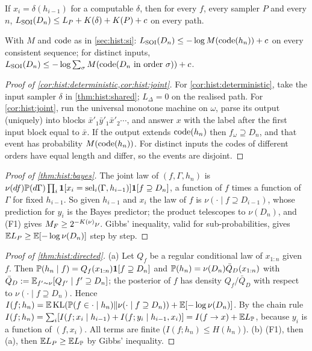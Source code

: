\begin{corollary}\label{cor:hist:deterministic}
If $x_i=\delta(h_{i-1})$ for a computable $\delta$, then for every $f$, every sampler $P$ and every $n$, $L_{\mathrm{SOI}}(D_n)\le L_P+K(\delta)+K(P)+c$ on every path.
\end{corollary}

\begin{corollary}\label{cor:hist:joint}
With $M$ and $\operatorname{code}$ as in \cref{sec:hist:si}: $L_{\mathrm{SOI}}(D_n)\le-\log M(\operatorname{code}(h_n))+c$ on every consistent sequence; for distinct inputs, $L_{\mathrm{SOI}}(D_n)\le-\log\sum_\sigma M(\operatorname{code}(D_n\text{ in order }\sigma))+c$.
\end{corollary}

\begin{proof}[Proof of \cref{cor:hist:deterministic,cor:hist:joint}]
For \cref{cor:hist:deterministic}, take the input sampler $\delta$ in \cref{thm:hist:shared}; $L_\Delta=0$ on the realised path. For \cref{cor:hist:joint}, run the universal monotone machine on $\omega$, parse its output (uniquely) into blocks $\bar x'_1\bar y'_1\bar x'_2\cdots$, and answer $x$ with the label after the first input block equal to $\bar x$. If the output extends $\operatorname{code}(h_n)$ then $f_\omega\supseteq D_n$, and that event has probability $M(\operatorname{code}(h_n))$. For distinct inputs the codes of different orders have equal length and differ, so the events are disjoint.
\end{proof}

\begin{proof}[Proof of \cref{thm:hist:bayes}]
The joint law of $(f,\Gamma,h_n)$ is $\nu(df)\mathbb{P}(d\Gamma)\prod_i\mathbf{1}[x_i=\mathrm{sel}_i(\Gamma,h_{i-1})]\mathbf{1}[f\supseteq D_n]$, a function of $f$ times a function of $\Gamma$ for fixed $h_{i-1}$. So given $h_{i-1}$ and $x_i$ the law of $f$ is $\nu(\cdot\mid f\supseteq D_{i-1})$, whose prediction for $y_i$ is the Bayes predictor; the product telescopes to $\nu(D_n)$, and (F1) gives $M_{F}\ge2^{-K(\nu)}\nu$. Gibbs' inequality, valid for sub-probabilities, gives $\mathbb{E} L_P\ge\mathbb{E}[-\log\nu(D_n)]$ step by step.
\end{proof}

\begin{proof}[Proof of \cref{thm:hist:directed}]
(a) Let $Q_f$ be a regular conditional law of $x_{1:n}$ given $f$. Then $\mathbb{P}(h_n\mid f)=Q_f(x_{1:n})\mathbf{1}[f\supseteq D_n]$ and $\mathbb{P}(h_n)=\nu(D_n)\bar Q_D(x_{1:n})$ with $\bar Q_D:=\mathbb{E}_{f'\sim\nu}[Q_{f'}\mid f'\supseteq D_n]$; the posterior of $f$ has density $Q_f/\bar Q_D$ with respect to $\nu(\cdot\mid f\supseteq D_n)$. Hence $I(f;h_n)=\mathbb{E}\operatorname{KL}(\mathbb{P}(f\in\cdot\mid h_n)\Vert\nu(\cdot\mid f\supseteq D_n))+\mathbb{E}[-\log\nu(D_n)]$. By the chain rule $I(f;h_n)=\sum_i[I(f;x_i\mid h_{i-1})+I(f;y_i\mid h_{i-1},x_i)]=I(f\to x)+\mathbb{E} L_{\mathbb{P}}$, because $y_i$ is a function of $(f,x_i)$. All terms are finite ($I(f;h_n)\le H(h_n)$). (b) (F1), then (a), then $\mathbb{E} L_P\ge\mathbb{E} L_{\mathbb{P}}$ by Gibbs' inequality.
\end{proof}


